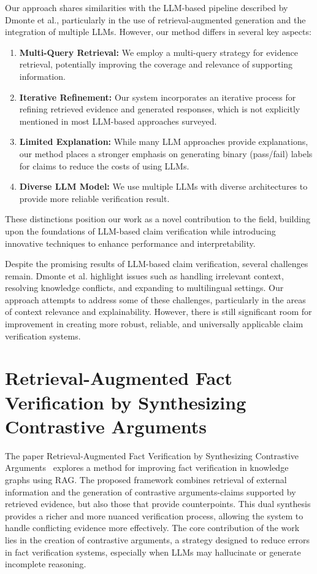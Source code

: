 Our approach shares similarities with the LLM-based pipeline described by Dmonte et al., particularly in the use of retrieval-augmented generation and the integration of multiple LLMs. However, our method differs in several key aspects:
\begin{enumerate}
    \item \textbf{Multi-Query Retrieval:} We employ a multi-query strategy for evidence retrieval, potentially improving the coverage and relevance of supporting information.
    \item \textbf{Iterative Refinement:} Our system incorporates an iterative process for refining retrieved evidence and generated responses, which is not explicitly mentioned in most LLM-based approaches surveyed.
    \item \textbf{Limited Explanation:} While many LLM approaches provide explanations, our method places a stronger emphasis on generating binary (pass/fail) labels for claims to reduce the costs of using LLMs.
    \item \textbf{Diverse LLM Model:} We use multiple LLMs with diverse architectures to provide more reliable verification result.
\end{enumerate}

These distinctions position our work as a novel contribution to the field, building upon the foundations of LLM-based claim verification while introducing innovative techniques to enhance performance and interpretability.

Despite the promising results of LLM-based claim verification, several challenges remain.
Dmonte et al. highlight issues such as handling irrelevant context, resolving knowledge conflicts, and expanding to multilingual settings. Our approach attempts to address some of these challenges, particularly in the areas of context relevance and explainability. However, there is still significant room for improvement in creating more robust, reliable, and universally applicable claim verification systems.

\section{Retrieval-Augmented Fact Verification by Synthesizing Contrastive Arguments}\label{sec:retrieval-augmented-fact-verification}
The paper Retrieval-Augmented Fact Verification by Synthesizing Contrastive Arguments~\cite{yue2024retrievalaugmentedfactverification} explores a method for improving fact verification in knowledge graphs using RAG.
The proposed framework combines retrieval of external information and the generation of contrastive arguments-claims supported by retrieved evidence, but also those that provide counterpoints.
This dual synthesis provides a richer and more nuanced verification process, allowing the system to handle conflicting evidence more effectively.
The core contribution of the work lies in the creation of contrastive arguments, a strategy designed to reduce errors in fact verification systems, especially when LLMs may hallucinate or generate incomplete reasoning.

